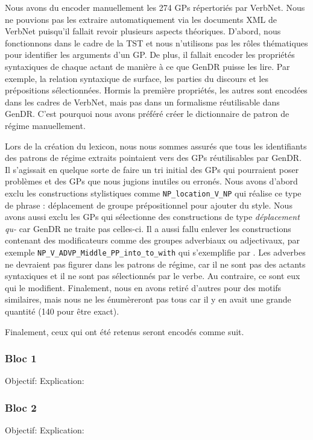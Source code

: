 Nous avons du encoder manuellement les 274 \acp{GP} répertoriés par VerbNet. Nous ne pouvions pas les extraire automatiquement via les documents XML de VerbNet puisqu'il fallait revoir plusieurs aspects théoriques. D'abord, nous fonctionnons dans le cadre de la \ac{TST} et nous n'utilisons pas les rôles thématiques pour identifier les arguments d'un \ac{GP}. De plus, il fallait encoder les propriétés syntaxiques de chaque actant de manière à ce que GenDR puisse les lire. Par exemple, la relation syntaxique de surface, les parties du discours et les prépositions sélectionnées. Hormis la première propriétés, les autres sont encodées dans les cadres de VerbNet, mais pas dans un formalisme réutilisable dans GenDR. C'est pourquoi nous avons préféré créer le dictionnaire de patron de régime manuellement.

Lors de la création du lexicon, nous nous sommes assurés que tous les identifiants des patrons de régime extraits pointaient vers des \acp{GP} réutilisables par GenDR. Il s'agissait en quelque sorte de faire un tri initial des \acp{GP} qui pourraient poser problèmes et des \acp{GP} que nous jugions inutiles ou erronés. Nous avons d'abord exclu les constructions stylistiques comme \lstinline|NP_location_V_NP| qui réalise ce type de phrase : déplacement de groupe prépositionnel pour ajouter du style. Nous avons aussi exclu les \acp{GP} qui sélectionne des constructions de type \emph{déplacement qu-} car GenDR ne traite pas celles-ci. Il a aussi fallu enlever les constructions contenant des modificateurs comme des groupes adverbiaux ou adjectivaux, par exemple \lstinline|NP_V_ADVP_Middle_PP_into_to_with| qui s'exemplifie par . Les adverbes ne devraient pas figurer dans les patrons de régime, car il ne sont pas des actants syntaxiques et il ne sont pas sélectionnés par le verbe. Au contraire, ce sont eux qui le modifient. Finalement, nous en avons retiré d'autres pour des motifs similaires, mais nous ne les énumèreront pas tous car il y en avait une grande quantité (140 pour être exact).

Finalement, ceux qui ont été retenus seront encodés comme suit.

\subsubsection{Bloc 1}
Objectif:
Explication:
\subsubsection{Bloc 2}
Objectif:
Explication:
